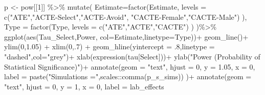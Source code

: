 \documentclass[
]{article}
\newenvironment{Shaded}{\begin{snugshade}}{\end{snugshade}}
\newcommand{\AttributeTok}[1]{\textcolor[rgb]{0.77,0.63,0.00}{#1}}
\newcommand{\DecValTok}[1]{\textcolor[rgb]{0.00,0.00,0.81}{#1}}
\newcommand{\FloatTok}[1]{\textcolor[rgb]{0.00,0.00,0.81}{#1}}
\newcommand{\FunctionTok}[1]{\textcolor[rgb]{0.00,0.00,0.00}{#1}}
\newcommand{\NormalTok}[1]{#1}
\newcommand{\OtherTok}[1]{\textcolor[rgb]{0.56,0.35,0.01}{#1}}
\newcommand{\SpecialCharTok}[1]{\textcolor[rgb]{0.00,0.00,0.00}{#1}}
\newcommand{\StringTok}[1]{\textcolor[rgb]{0.31,0.60,0.02}{#1}}
\begin{document}
\begin{Shaded}
\begin{Highlighting}[]
\NormalTok{  p }\OtherTok{\textless{}{-}}\NormalTok{ pow[[}\DecValTok{1}\NormalTok{]] }\SpecialCharTok{\%\textgreater{}\%}
    \FunctionTok{mutate}\NormalTok{(}
      \AttributeTok{Estimate=}\FunctionTok{factor}\NormalTok{(Estimate,}
                      \AttributeTok{levels =} \FunctionTok{c}\NormalTok{(}\StringTok{"ATE"}\NormalTok{,}\StringTok{"ACTE{-}Select"}\NormalTok{,}\StringTok{"ACTE{-}Avoid"}\NormalTok{,}
                                 \StringTok{"CACTE{-}Female"}\NormalTok{,}\StringTok{"CACTE{-}Male"}\NormalTok{)}
\NormalTok{      ),}
      \AttributeTok{Type =} \FunctionTok{factor}\NormalTok{(Type, }
                    \AttributeTok{levels =} \FunctionTok{c}\NormalTok{(}\StringTok{"ATE"}\NormalTok{,}\StringTok{"ACTE"}\NormalTok{,}\StringTok{"CACTE"}\NormalTok{)}
\NormalTok{      )}
\NormalTok{    )}\SpecialCharTok{\%\textgreater{}\%}
    \FunctionTok{ggplot}\NormalTok{(}\FunctionTok{aes}\NormalTok{(Tau\_Select,Power, }\AttributeTok{col=}\NormalTok{Estimate,}\AttributeTok{linetype=}\NormalTok{Type))}\SpecialCharTok{+}
    \FunctionTok{geom\_line}\NormalTok{()}\SpecialCharTok{+}
    \FunctionTok{ylim}\NormalTok{(}\DecValTok{0}\NormalTok{,}\FloatTok{1.05}\NormalTok{) }\SpecialCharTok{+}
    \FunctionTok{xlim}\NormalTok{(}\DecValTok{0}\NormalTok{,.}\DecValTok{7}\NormalTok{) }\SpecialCharTok{+}
    \FunctionTok{geom\_hline}\NormalTok{(}\AttributeTok{yintercept =}\NormalTok{ .}\DecValTok{8}\NormalTok{,}\AttributeTok{linetype =} \StringTok{"dashed"}\NormalTok{,}\AttributeTok{col=}\StringTok{"grey"}\NormalTok{)}\SpecialCharTok{+}
    \FunctionTok{xlab}\NormalTok{(}\FunctionTok{expression}\NormalTok{(tau[Select]))}\SpecialCharTok{+}
    \FunctionTok{ylab}\NormalTok{(}\StringTok{"Power (Probability of Statistical Significance)"}\NormalTok{)}\SpecialCharTok{+}
    \FunctionTok{annotate}\NormalTok{(}\AttributeTok{geom =} \StringTok{"text"}\NormalTok{,}
             \AttributeTok{hjust =} \DecValTok{0}\NormalTok{,}
             \AttributeTok{y =} \FloatTok{1.05}\NormalTok{,}
             \AttributeTok{x =} \DecValTok{0}\NormalTok{,}
             \AttributeTok{label =} \FunctionTok{paste}\NormalTok{(}\StringTok{"Simulations ="}\NormalTok{,scales}\SpecialCharTok{::}\FunctionTok{comma}\NormalTok{(p\_s\_sims))}
\NormalTok{    )}\SpecialCharTok{+}
    \FunctionTok{annotate}\NormalTok{(}\AttributeTok{geom =} \StringTok{"text"}\NormalTok{,}
             \AttributeTok{hjust =} \DecValTok{0}\NormalTok{,}
             \AttributeTok{y =} \DecValTok{1}\NormalTok{,}
             \AttributeTok{x =} \DecValTok{0}\NormalTok{,}
             \AttributeTok{label =}\NormalTok{ lab\_effects}

\end{Highlighting}
\end{Shaded}
\end{document}
